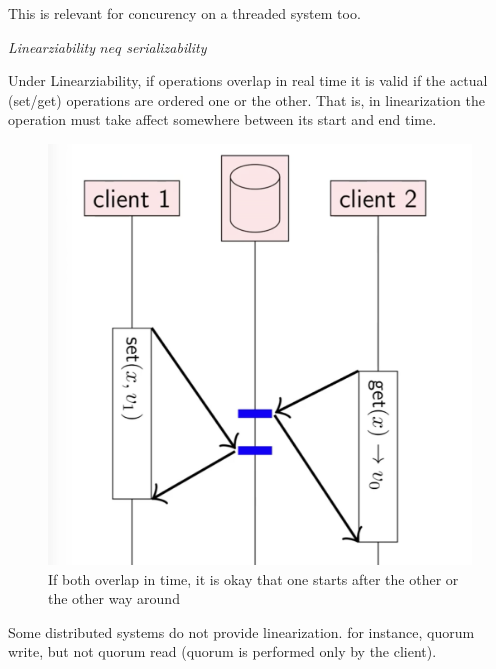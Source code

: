 This is relevant for concurency on a threaded system too.

\emph{Linearziability $neq$ serializability}


Under Linearziability, if operations overlap in real time 
it is valid if the actual (set/get) operations are ordered one or the other.
That is, in linearization the operation must take affect somewhere between
its start and end time.
 
 \begin{figure}[t]
        \centering
        \includegraphics[scale=0.25]{computer-sceince/distributed-media/linearization.png}
        \caption{ If both overlap in time, it is okay that one starts after the other or the other way around
        }
\end{figure}

Some distributed systems do not provide linearization. 
for instance, quorum write, but not quorum read (quorum is performed only by the client).


